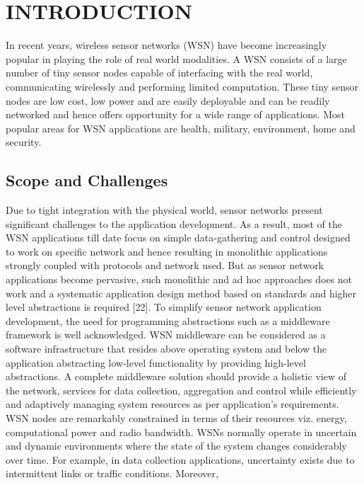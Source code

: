 \chapter{INTRODUCTION}


In recent years, wireless sensor networks (WSN)
have become increasingly popular in playing the
role of real world modalities. A WSN consists of a
large number of tiny sensor nodes capable of
interfacing with the real world, communicating
wirelessly and performing limited computation.
These tiny sensor nodes are low cost, low power and
are easily deployable and can be readily networked
and hence offers opportunity for a wide range of
applications. Most popular areas for WSN
applications are health, military, environment,
home and security.
%
\section{Scope and Challenges}
\label{scope-challenges}
Due to tight integration with the physical world,
sensor networks present significant challenges to
the application development. As a result, most of
the WSN applications till date focus on simple
data-gathering and control designed to work on
specific network and hence resulting in monolithic
applications strongly coupled with protocols and
network used. But as sensor network applications
become pervasive, such monolithic and ad hoc
approaches does not work and a systematic
application design method based on standards and
higher level abstractions is required [22]. To
simplify sensor network application development,
the need for programming abstractions such as a
middleware framework is well acknowledged. WSN
middleware can be considered as a software
infrastructure that resides above operating system
and below the application abstracting low-level
functionality by providing high-level abstractions.
A complete middleware solution should provide a
holistic view of the network, services for data
collection, aggregation and control while
efficiently and adaptively managing system
resources as per application's requirements. \\ 
WSN nodes are remarkably constrained in terms of
their resources viz. energy, computational power
and radio bandwidth. WSNs normally operate in
uncertain and dynamic environments where the state
of the system changes considerably over time.
For example, in data collection applications, uncertainty exists due to
intermittent links or traffic conditions. Moreover,
